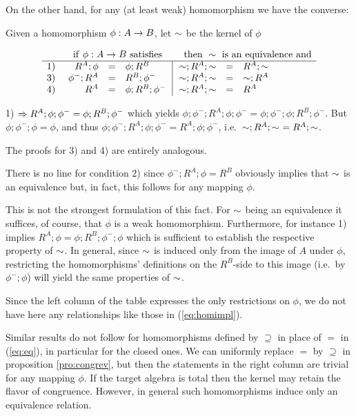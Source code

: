 \documentclass[10pt]{article}
\begin{document}
On the other hand, for any (at least weak) homomorphism we have the
converse:

\begin{Prop}\label{pro:congrev} 
Given a homomorphism $\phi:A\rightarrow B$, let $\sim$ be the kernel of
$\phi$

\[
\begin{array}{r@{\ \ \ \ }rcl@{\ \ }|@{\ \ }rcl}
& \multicolumn{3}{l}{{\rm if\ }\phi:A\into B{\rm\ satisfies}} & \multicolumn{3}{c}{{\rm then\ }\congo\ 
{\rm is\ an\ equivalence\ and} } \\ \hline
1) & R^A;\phi &=& \phi;R^B      & \congo;R^A;\congo & = & R^A;\congo   \\
3) & \phi^-;R^A &=& R^B;\phi^-  & \congo;R^A;\congo & = & \congo;R^A \\
4) & R^A &=& \phi;R^B;\phi^-    & \congo;R^A;\congo & = & R^A    
\end{array}
\]
\end{Prop}
\begin{Proof}

1) $\Rightarrow R^A;\phi;\phi^-=\phi;R^B;\phi^-$ which yields
$\phi;\phi^-;R^A;\phi;\phi^-=\phi;\phi^-;\phi;R^B;\phi^-$.
But $\phi;\phi^-;\phi=\phi$, and thus 
$\phi;\phi^-;R^A;\phi;\phi^-=R^A;\phi;\phi^-$, 
i.e.\ $\sim;R^A;\sim\ = R^A;\sim$.

The proofs for 3) and 4) are entirely analogous.
\end{Proof}

\noindent
There is no line for condition 2) since $\phi^-;R^A;\phi=R^B$
obviously implies that $\sim$ is an equivalence but, in fact, this
follows for any mapping $\phi$.

This is not the strongest formulation of this fact. For $\sim$ being
an equivalence it suffices, of course, that $\phi$ is a weak
homomorphism.  Furthermore, for instance 1) implies
$R^A;\phi=\phi;R^B;\phi^-;\phi$ which is sufficient to establish the
respective property of $\sim$. In general, since $\sim$ is induced
only from the image of $A$ under $\phi$, restricting the
homomorphisms' definitions on the $R^B$-side to this image (i.e.\ by
$\phi^-;\phi$) will yield the same properties of $\sim$.

Since the left column of the table expresses the only restrictions on
$\phi$, we do not have here any relationships like those in
(\ref{eq:homimpl}).

Similar results do not follow for homomorphisms defined by $\supseteq$
in place of $=$ in (\ref{eq:eq}), in particular for the closed ones.
We can uniformly replace $=$ by $\supseteq$ in proposition
\ref{pro:congrev}, but then the statements in the right column are trivial for
any mapping $\phi$.  If the target algebra is total then the kernel
may retain the flavor of congruence. However, in general such
homomorphisms induce only an equivalence relation.
\end{document}
